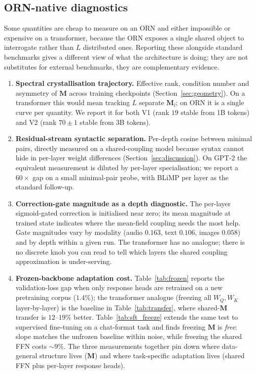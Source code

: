 \documentclass[10pt,twocolumn]{article}
\newcommand{\M}{\mathbf{M}}
\begin{document}
\subsection{ORN-native diagnostics}
\label{sec:native_diag}

Some quantities are cheap to measure on an ORN and either impossible or expensive on a transformer, because the ORN exposes a single shared object to interrogate rather than $L$ distributed ones.
Reporting these alongside standard benchmarks gives a different view of what the architecture is doing; they are not substitutes for external benchmarks, they are complementary evidence.

\begin{enumerate}[nosep,leftmargin=1.5em]
\item \textbf{Spectral crystallisation trajectory.} Effective rank, condition number and asymmetry of $\M$ across training checkpoints (Section~\ref{sec:geometry}). On a transformer this would mean tracking $L$ separate $\M_l$; on ORN it is a single curve per quantity. We report it for both V1 (rank $19$ stable from 1B tokens) and V2 (rank $70\pm 1$ stable from 3B tokens).
\item \textbf{Residual-stream syntactic separation.} Per-depth cosine between minimal pairs, directly measured on a shared-coupling model because syntax cannot hide in per-layer weight differences (Section~\ref{sec:discussion}). On GPT-2 the equivalent measurement is diluted by per-layer specialisation; we report a $60\times$ gap on a small minimal-pair probe, with BLiMP per layer as the standard follow-up.
\item \textbf{Correction-gate magnitude as a depth diagnostic.} The per-layer sigmoid-gated correction is initialised near zero; its mean magnitude at trained state indicates where the mean-field coupling needs the most help. Gate magnitudes vary by modality (audio $0.163$, text $0.106$, images $0.058$) and by depth within a given run. The transformer has no analogue; there is no discrete knob you can read to tell which layers the shared coupling approximation is under-serving.
\item \textbf{Frozen-backbone adaptation cost.} Table~\ref{tab:frozen} reports the validation-loss gap when only response heads are retrained on a new pretraining corpus ($1.4\%$); the transformer analogue (freezing all $W_Q, W_K$ layer-by-layer) is the baseline in Table~\ref{tab:transfer}, where shared-$\M$ transfer is $12$--$19\%$ better. Table~\ref{tab:sft_freeze} extends the same test to supervised fine-tuning on a chat-format task and finds freezing $\M$ is \emph{free}: slope matches the unfrozen baseline within noise, while freezing the shared FFN costs $\sim 9\%$. The three measurements together pin down where data-general structure lives ($\M$) and where task-specific adaptation lives (shared FFN plus per-layer response heads).

\end{enumerate}
\end{document}

